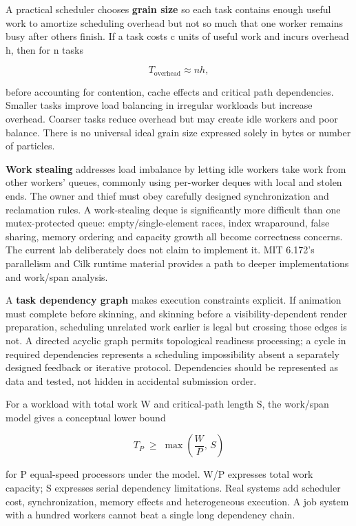 A practical scheduler chooses \textbf{grain size} so each task contains enough useful work to amortize scheduling overhead but not so much that one worker remains busy after others finish. If a task costs c units of useful work and incurs overhead h, then for n tasks

\[
T_{\mathrm{overhead}}\approx n h,
\]

before accounting for contention, cache effects and critical path dependencies. Smaller tasks improve load balancing in irregular workloads but increase overhead. Coarser tasks reduce overhead but may create idle workers and poor balance. There is no universal ideal grain size expressed solely in bytes or number of particles.

\textbf{Work stealing} addresses load imbalance by letting idle workers take work from other workers' queues, commonly using per-worker deques with local and stolen ends. The owner and thief must obey carefully designed synchronization and reclamation rules. A work-stealing deque is significantly more difficult than one mutex-protected queue: empty/single-element races, index wraparound, false sharing, memory ordering and capacity growth all become correctness concerns. The current lab deliberately does not claim to implement it. MIT 6.172's parallelism and Cilk runtime material provides a path to deeper implementations and work/span analysis.

A \textbf{task dependency graph} makes execution constraints explicit. If animation must complete before skinning, and skinning before a visibility-dependent render preparation, scheduling unrelated work earlier is legal but crossing those edges is not. A directed acyclic graph permits topological readiness processing; a cycle in required dependencies represents a scheduling impossibility absent a separately designed feedback or iterative protocol. Dependencies should be represented as data and tested, not hidden in accidental submission order.

For a workload with total work W and critical-path length S, the work/span model gives a conceptual lower bound

\[
T_P\;\geq\;\max\!\left(\frac{W}{P},\, S\right)
\]

for P equal-speed processors under the model. W/P expresses total work capacity; S expresses serial dependency limitations. Real systems add scheduler cost, synchronization, memory effects and heterogeneous execution. A job system with a hundred workers cannot beat a single long dependency chain.

